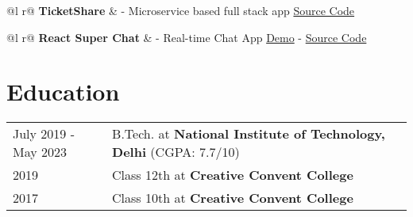 \documentclass[a4paper,12pt]{article}
\begin{document}
\begin{tabularx}{\linewidth}{ @{}l r@{} }
\textbf{TicketShare} & - Microservice based full stack app \hfill \href{https://github.com/Hardik5862/ticketshare}{Source Code} \\[3.75pt]
\end{tabularx}

\begin{tabularx}{\linewidth}{ @{}l r@{} }
\textbf{React Super Chat} & - Real-time Chat App \hfill \href{https://react-super-chat-460bb.web.app}{Demo} - \href{https://github.com/Hardik5862/ticketshare}{Source Code} \\[3.75pt]
\end{tabularx}

\section{Education}
\begin{tabularx}{\linewidth}{@{}l X@{}}	
July 2019 - May 2023 & B.Tech. at \textbf{National Institute of Technology, Delhi} \hfill \normalsize (CGPA: 7.7/10) \\

2019 & Class 12th at \textbf{Creative Convent College} \\

2017 & Class 10th at \textbf{Creative Convent College} \\
\end{tabularx}
\end{document}
